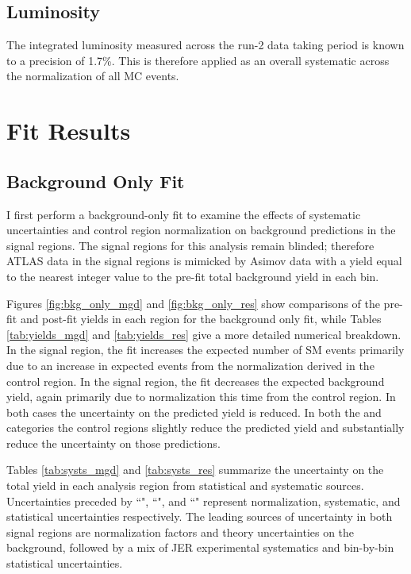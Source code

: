 \subsection{Luminosity}
The integrated luminosity measured across the run-2 data taking period is known to a precision of 1.7\%. This is therefore applied as an overall systematic across the normalization of all MC events.

\section{Fit Results}
\subsection{Background Only Fit}
I first perform a background-only fit to examine the effects of systematic uncertainties and control region normalization on background predictions in the signal regions. The signal regions for this analysis remain blinded; therefore ATLAS data in the signal regions is mimicked by Asimov data with a yield equal to the nearest integer value to the pre-fit total background yield in each bin.

Figures \ref{fig:bkg_only_mgd} and \ref{fig:bkg_only_res} show comparisons of the pre-fit and post-fit yields in each region for the background only fit, while Tables \ref{tab:yields_mgd} and \ref{tab:yields_res} give a more detailed numerical breakdown. In the \merged signal region, the fit increases the expected number of SM events primarily due to an increase in expected \wjets events from the normalization derived in the \merged \wjets control region. In the \resolved signal region, the fit decreases the expected background yield, again primarily due to normalization this time from the \resolved \wjets control region. In both cases the uncertainty on the predicted \wjets yield is reduced. In both the \merged and \resolved categories the \ttbar control regions slightly reduce the predicted \ttbar yield and substantially reduce the uncertainty on those predictions.

Tables \ref{tab:systs_mgd} and \ref{tab:systs_res} summarize the uncertainty on the total yield in each analysis region from statistical and systematic sources. Uncertainties preceded by ``\mu", ``\alpha", and ``\gamma" represent normalization, systematic, and statistical uncertainties respectively. The leading sources of uncertainty in both signal regions are normalization factors and theory uncertainties on the \wjets background, followed by a mix of JER experimental systematics and bin-by-bin statistical uncertainties.

